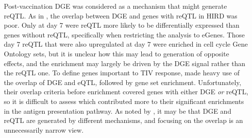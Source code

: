 Post-vaccination \gls{DGE} was considered as a mechanism that might generate \gls{reQTL}.
As in \textcite{kim-hellmuth2017GeneticRegulatoryEffects, davenport2018DiscoveringVivoCytokineeQTL}, the overlap between \gls{DGE} and genes with reQTL in \gls{HIRD} was poor.
Only at day 7 were \gls{reQTL} more likely to be differentially expressed than genes without reQTL, specifically when restricting the analysis to eGenes.
Those day 7 \gls{reQTL} that were also upregulated at day 7 were enriched in cell cycle Gene Ontology sets, but it is unclear how this may lead to generation of opposite effects, and the enrichment may largely be driven by the \gls{DGE} signal rather than the \gls{reQTL} one.
To define genes important to \gls{TIV} response,
\textcite{franco2013IntegrativeGenomicAnalysis} made heavy use of the overlap of \gls{DGE} and \gls{eQTL}, followed by gene set enrichment.
Unfortunately, their overlap criteria before enrichment covered genes with either \gls{DGE} \emph{or} \gls{reQTL}, so it is difficult to assess 
which contributed more to their significant enrichments in the antigen presentation pathway.
As noted by \textcite{davenport2018DiscoveringVivoCytokineeQTL,cuomo2020SinglecellRNAsequencingDifferentiating}, 
it may be that \gls{DGE} and \gls{reQTL} are generated by different mechanisms, and focusing on the overlap is an unnecessarily narrow view. 

